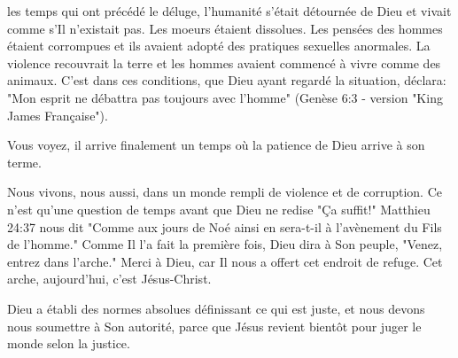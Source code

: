 \documentclass[paper=6.13in:9.21in,pagesize=pdftex,10pt,DIV=calc]{scrbook}
\begin{document}



 les temps qui ont précédé le déluge, l'humanité s'était détournée de Dieu et vivait comme s'Il n'existait pas. Les moeurs étaient dissolues. Les pensées des hommes étaient corrompues et ils avaient adopté des pratiques sexuelles anormales. La violence recouvrait la terre et les hommes avaient commencé à vivre comme des animaux. C'est dans ces conditions, que Dieu ayant regardé la situation, déclara: "Mon esprit ne débattra pas toujours avec l’homme" (Genèse 6:3 - version "King James Française"). 

Vous voyez, il arrive finalement un temps où la patience de Dieu arrive à son terme. 

Nous vivons, nous aussi, dans un monde rempli de violence et de corruption. Ce n'est qu'une question de temps avant que Dieu ne redise "Ça suffit!" Matthieu 24:37 nous dit "Comme aux jours de Noé ainsi en sera-t-il à l'avènement du Fils de l'homme." Comme Il l'a fait la première fois, Dieu dira à Son peuple, "Venez, entrez dans l'arche." Merci à Dieu, car Il nous a offert cet endroit de refuge. Cet arche, aujourd'hui, c'est Jésus-Christ.




Dieu a établi des normes absolues définissant ce qui est juste, et nous devons nous soumettre à Son autorité, parce que Jésus revient bientôt pour juger le monde selon la justice.

\dvrule



\end{document}
